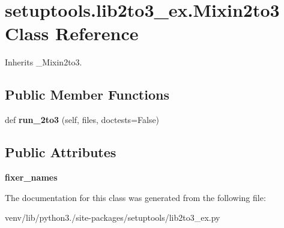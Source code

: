 \hypertarget{classsetuptools_1_1lib2to3__ex_1_1_mixin2to3}{}\section{setuptools.\+lib2to3\+\_\+ex.\+Mixin2to3 Class Reference}
\label{classsetuptools_1_1lib2to3__ex_1_1_mixin2to3}


Inherits \+\_\+\+Mixin2to3.

\subsection*{Public Member Functions}
\begin{DoxyCompactItemize}
\item 
\mbox{\label{classsetuptools_1_1lib2to3__ex_1_1_mixin2to3_aae906a32ac6d5e790cc30d9505995f11}} 
def {\bfseries run\+\_\+2to3} (self, files, doctests=False)
\end{DoxyCompactItemize}
\subsection*{Public Attributes}
\begin{DoxyCompactItemize}
\item 
\mbox{\label{classsetuptools_1_1lib2to3__ex_1_1_mixin2to3_a09fadc61ca6a8492f7bad8914da2f60c}} 
{\bfseries fixer\+\_\+names}
\end{DoxyCompactItemize}


The documentation for this class was generated from the following file\+:\begin{DoxyCompactItemize}
\item 
venv/lib/python3./site-\/packages/setuptools/lib2to3\+\_\+ex.\+py\end{DoxyCompactItemize}
